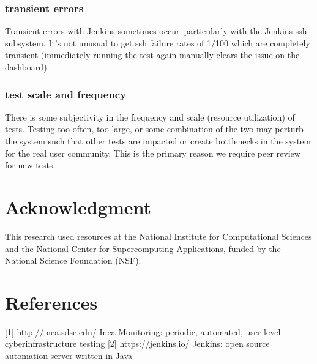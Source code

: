 \documentclass[10pt, conference, compsocconf]{IEEEtran}
\begin{document}
\subsubsection{transient errors}
Transient errors with Jenkins sometimes occur--particularly with the Jenkins ssh subsystem.  It's not unusual to get ssh failure rates of 1/100 which are completely transient (immediately running the test again manually clears the issue on the dashboard).
\subsubsection{test scale and frequency}
There is some subjectivity in the frequency and scale (resource utilization) of tests.  Testing too often, too large, or some combination of the two may perturb the system such that other tests are impacted or create bottlenecks in the system for the real user community.  This is the primary reason we require peer review for new tests.
\label{sec:conclusion}

\section*{Acknowledgment}
This research used resources at the National Institute for Computational Sciences and the National Center for Supercomputing Applications, funded by the National Science Foundation (NSF).

\IEEEtriggercmd{\enlargethispage{-2in}}

\section*{References}
[1] http://inca.sdsc.edu/ Inca Monitoring: periodic, automated, user-level cyberinfrastructure testing
[2] https://jenkins.io/ Jenkins: open source automation server written in Java

%
%
%


%
%
%


\end{document}

